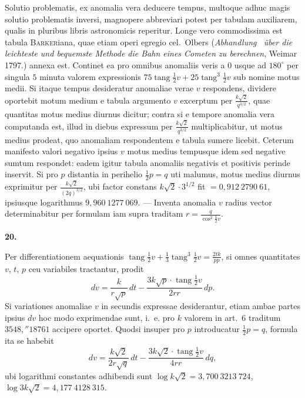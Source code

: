 \documentclass[12pt,a4paper]{book}
\newcommand{\tang}{\operatorname{tang}}
\begin{document}
Solutio problematis, ex anomalia vera deducere tempus, multoque adhuc magis solutio problematis inversi, magnopere abbreviari potest per tabulam auxiliarem, qualis in pluribus libris astronomicis reperitur. Longe vero commodissima est tabula \textsc{Barker}iana, quae etiam operi egregio cel.~Olbers (\textit{Abhandlung \ über die leichteste und bequemste Methode die Bahn eines Cometen zu berechnen}, Weimar 1797.) annexa est. Continet ea pro omnibus anomaliis veris a $0$ usque ad $180^{\circ}$ per singula $5$ minuta valorem expressionis $75\tang\tfrac{1}{2}v+25\tang^{3}\tfrac{1}{2}v$ sub nomine motus medii. Si itaque tempus desideratur anomaliae verae $v$ respondens, dividere oportebit motum medium e tabula argumento $v$ excerptum per $\frac{k\sqrt{2}}{q^{3/2}}$, quae quantitas motus medius diurnus dicitur; contra si e tempore anomalia vera computanda est, illud in diebus expressum per $\frac{k\sqrt{2}}{q^{3/2}}$ multiplicabitur, ut motus medius prodeat, quo anomaliam respondentem e tabula sumere licebit. Ceterum manifesto valori negativo ipsius $v$ motus medius tempusque idem sed negative sumtum respondet: eadem igitur tabula anomaliis negativis et positivis perinde inservit. Si pro $p$ distantia in perihelio $\tfrac{1}{2}p=q$ uti malumus, motus medius diurnus exprimitur per $\frac{k\sqrt{2}}{(2q)^{3/2}}$, ubi factor constans $k\sqrt{2}\cdot 3^{1/2}$ fit $=0{,}912\ 2790\ 61$, ipsiusque logarithmus $9{,}960\ 1277\ 069$. --- Inventa anomalia $v$ radius vector determinabitur per formulam iam supra traditam $r=\frac{q}{\cos^{2}\tfrac{1}{2}v}$.

\textbf{20.}

Per differentiationem aequationis $\tang\tfrac{1}{2}v+\tfrac{1}{3}\tang^{3}\tfrac{1}{2}v=\frac{2tk}{pp}$, si omnes quantitates $v$, $t$, $p$ ceu variabiles tractantur, prodit
\[
dv=\frac{k}{r\sqrt{p}}\,dt-\frac{3k\sqrt{p}\cdot\tang\tfrac{1}{2}v}{2rr}\,dp.
\]
Si variationes anomaliae $v$ in secundis expressae desiderantur, etiam ambae partes ipsius $dv$ hoc modo exprimendae sunt, i.~e. pro $k$ valorem in art.~6 traditum $3548{,}''18761$ accipere oportet. Quodsi insuper pro $p$ introducatur $\tfrac{1}{2}p=q$, formula ita se habebit
\[
dv=\frac{k\sqrt{2}}{2r\sqrt{q}}\,dt-\frac{3k\sqrt{2}\cdot\tang\tfrac{1}{2}v}{4rr}\,dq,
\]
ubi logarithmi constantes adhibendi sunt $\log k\sqrt{2}=3{,}700\ 3213\ 724$, $\log 3k\sqrt{2}=4{,}177\ 4128\ 315$.
\end{document}
